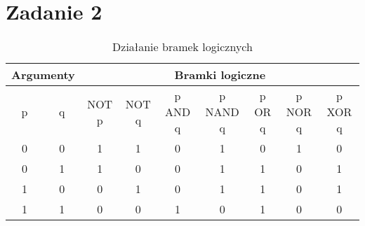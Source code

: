 \documentclass[a4paper]{article}
\begin{document}
\newpage
\section{Zadanie 2}

\begin{table}[h]
\centering\caption{Działanie bramek logicznych}
\begin{tabular}{|c|c|c|c|c|c|c|c|c|}
	\hline
	\multicolumn{2}{|c|}{Argumenty} & \multicolumn{7}{|c|}{Bramki logiczne} \\
	\hline
	p & q & NOT p & NOT q & p AND q & p NAND q & p OR q & p NOR q & p XOR q \\
	\hline
	0 & 0 & 1 & 1 & 0 & 1 & 0 & 1 & 0 \\
	\hline
	0 & 1 & 1 & 0 & 0 & 1 & 1 & 0 & 1 \\
	\hline
	1 & 0 & 0 & 1 & 0 & 1 & 1 & 0 & 1 \\
	\hline
	1 & 1 & 0 & 0 & 1 & 0 & 1 & 0 & 0 \\
	\hline
\end{tabular}
\end{table}
\end{document}
